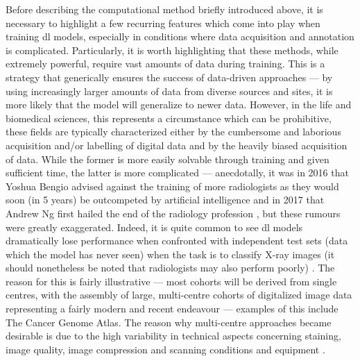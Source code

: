 Before describing the computational method briefly introduced above, it is necessary to highlight a few recurring features which come into play when training \ac{dl} models, especially in conditions where data acquisition and annotation is complicated. Particularly, it is worth highlighting that these methods, while extremely powerful, require vast amounts of data during training. This is a strategy that generically ensures the success of data-driven approaches --- by using increasingly larger amounts of data from diverse sources and sites, it is more likely that the model will generalize to newer data. However, in the life and biomedical sciences, this represents a circumstance which can be prohibitive, these fields are typically characterized either by the cumbersome and laborious acquisition and/or labelling of digital data and by the heavily biased acquisition of data. While the former is more easily solvable through training and given sufficient time, the latter is more complicated --- anecdotally, it was in 2016 that Yoshua Bengio advised against the training of more radiologists as they would soon (in 5 years) be outcompeted by artificial intelligence \cite{Creative_Destruction_Lab2016-zf} and in 2017 that Andrew Ng first hailed the end of the radiology profession \cite{Ng2017-tz}, but these rumours were greatly exaggerated. Indeed, it is quite common to see \ac{dl} models dramatically lose performance when confronted with independent test sets (data which the model has never seen) when the task is to classify X-ray images (it should nonetheless be noted that radiologists may also perform poorly) \cite{Rajpurkar2021-bj}. The reason for this is fairly illustrative --- most cohorts will be derived from single centres, with the assembly of large, multi-centre cohorts of digitalized image data representing a fairly modern and recent endeavour --- examples of this include The Cancer Genome Atlas. The reason why multi-centre approaches became desirable is due to the high variability in technical aspects concerning staining, image quality, image compression and scanning conditions and equipment \cite{Van_der_Laak2021-id}.

